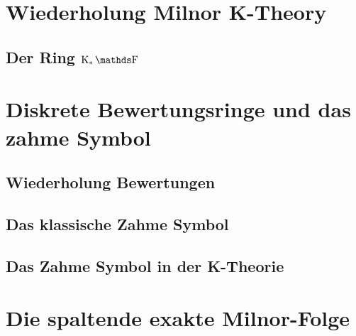 \documentclass[ngerman,fontsize=11pt, paper=a4, parskip=half, titlepage=true, toc=bib]{scrartcl}
\begin{document}
\maketitle
\tableofcontents




\section{Wiederholung Milnor K-Theory}
\subsection{Der Ring $\KF$}
\begin{Def}[$\KF$] \end{Def}


\section{Diskrete Bewertungsringe und das zahme Symbol}
\cite[][Lemma 2.1]{milnor}

\subsection{Wiederholung Bewertungen}
\begin{Def}[Bewertungsabbildung]\end{Def}
\begin{Def}\end{Def}

\subsection{Das klassische Zahme Symbol}
\begin{Def}\end{Def}

\subsection{Das Zahme Symbol in der K-Theorie}
\begin{Satz}\end{Satz}


\section{Die spaltende exakte Milnor-Folge}
\cite[][Theorem 2.3]{milnor}

\printindex

\nocite{*}
\printbibliography
\end{document}
